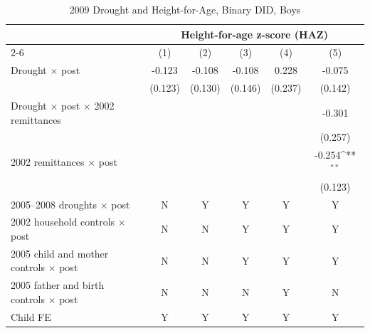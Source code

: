 \documentclass[12pt]{article}
\def\sym#1{\ifmmode^{#1}\else\(^{#1}\)\fi}
\begin{document}
\clearpage
\begingroup
\footnotesize
\renewcommand{\arraystretch}{0.86}
\setlength{\tabcolsep}{4pt}
\setlength{\LTcapwidth}{\textwidth}
\begin{longtable}{l*{5}{c}}
\caption{2009 Drought and Height-for-Age, Binary DID, Boys}\\
\toprule
 & \multicolumn{5}{c}{Height-for-age z-score (HAZ)}\\
\cmidrule(lr){2-6}
            &\multicolumn{1}{c}{(1)}         &\multicolumn{1}{c}{(2)}         &\multicolumn{1}{c}{(3)}         &\multicolumn{1}{c}{(4)}         &\multicolumn{1}{c}{(5)}         \\
\midrule
Drought \ensuremath{\times} post&      -0.123         &      -0.108         &      -0.108         &       0.228         &      -0.075         \\
            &     (0.123)         &     (0.130)         &     (0.146)         &     (0.237)         &     (0.142)         \\
Drought \ensuremath{\times} post \ensuremath{\times} 2002 remittances&                     &                     &                     &                     &      -0.301         \\
            &                     &                     &                     &                     &     (0.257)         \\
2002 remittances \ensuremath{\times} post&                     &                     &                     &                     &      -0.254\sym{**} \\
            &                     &                     &                     &                     &     (0.123)         \\
\midrule
2005--2008 droughts \ensuremath{\times} post&           N         &           Y         &           Y         &           Y         &           Y         \\
2002 household controls \ensuremath{\times} post&           N         &           N         &           Y         &           Y         &           Y         \\
2005 child and mother controls \ensuremath{\times} post&           N         &           N         &           Y         &           Y         &           Y         \\
2005 father and birth controls \ensuremath{\times} post&           N         &           N         &           N         &           Y         &           N         \\
Child FE    &           Y         &           Y         &           Y         &           Y         &           Y         \\

\end{longtable}
\end{document}
